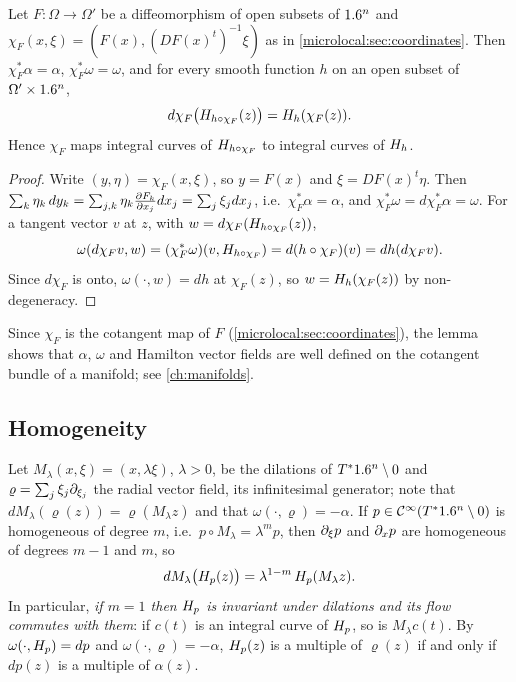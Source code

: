 \begin{lemma}\label{microlocal:lem:symplectic}
  Let $F:\Omega\to\Omega'$ be a diffeomorphism of open subsets of $1.6^n$ and
  $\chi_F(x,\xi)=(F(x),(DF(x)^t)^{-1}\xi)$ as in
  \cref{microlocal:sec:coordinates}. Then $\chi_F^*\alpha=\alpha$,
  $\chi_F^*\omega=\omega$, and for every smooth function $h$ on an open subset
  of $\Omega'\times1.6^n$,
  \begin{equation*}
    d\chi_F\bigl(H_{h\circ\chi_F}(z)\bigr)=H_{h}(\chi_F(z)).
  \end{equation*}
  Hence $\chi_F$ maps integral curves of $H_{h\circ\chi_F}$ to integral
  curves of $H_{h}$.
\end{lemma}
\begin{proof}
  Write $(y,\eta)=\chi_F(x,\xi)$, so $y=F(x)$ and $\xi=DF(x)^t\eta$. Then
  $\sum_k\eta_k\,dy_k=\sum_{j,k}\eta_k\frac{\partial F_k}{\partial x_j}dx_j=\sum_j\xi_jdx_j$,
  i.e.\ $\chi_F^*\alpha=\alpha$, and $\chi_F^*\omega=d\chi_F^*\alpha=\omega$. For
  a tangent vector $v$ at $z$, with $w=d\chi_F(H_{h\circ\chi_F}(z))$,
  \begin{equation*}
    \omega(d\chi_Fv,w)=(\chi_F^*\omega)(v,H_{h\circ\chi_F})
    =d(h\circ\chi_F)(v)=dh(d\chi_Fv).
  \end{equation*}
  Since $d\chi_F$ is onto, $\omega(\cdot,w)=dh$ at $\chi_F(z)$, so
  $w=H_{h}(\chi_F(z))$ by non-degeneracy.
\end{proof}

Since $\chi_F$ is the cotangent map of $F$ (\cref{microlocal:sec:coordinates}),
the lemma shows that $\alpha$, $\omega$ and Hamilton vector fields are well
defined on the cotangent bundle of a manifold; see \cref{ch:manifolds}.

\subsection{Homogeneity}
Let $M_\lambda(x,\xi)=(x,\lambda\xi)$, $\lambda>0$, be the dilations of
$T^*1.6^n\setminus0$ and $\varrho=\sum_j\xi_j\partial_{\xi_j}$ the radial vector field, its
infinitesimal generator; note that $dM_\lambda(\varrho(z))=\varrho(M_\lambda z)$
and that $\omega(\cdot,\varrho)=-\alpha$. If $p\in\mathcal{C}^\infty(T^*1.6^n\setminus0)$ is homogeneous
of degree $m$, i.e.\ $p\circ M_\lambda=\lambda^mp$, then $\partial_\xi p$ and $\partial_xp$
are homogeneous of degrees $m-1$ and $m$, so
\begin{equation}\label{microlocal:eq:H-homogeneous}
  dM_\lambda\bigl(H_{p}(z)\bigr)=\lambda^{1-m}\,H_{p}(M_\lambda z).
\end{equation}
In particular, \emph{if $m=1$ then $H_{p}$ is invariant under dilations and
its flow commutes with them}: if $c(t)$ is an integral curve of $H_{p}$, so
is $M_\lambda c(t)$. By $\omega(\cdot,H_{p})=dp$ and
$\omega(\cdot,\varrho)=-\alpha$, $H_{p}(z)$ is a multiple of $\varrho(z)$ if and
only if $dp(z)$ is a multiple of $\alpha(z)$.

